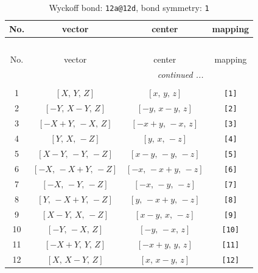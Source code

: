 \documentclass[fleqn,8pt]{jsarticle}
\begin{document}
\begin{longtable}{cccc}
\caption{Wyckoff bond: {\tt 12a@12d}, bond symmetry: {\tt 1}}
 \\
 \hline \hline
No. & vector & center & mapping \\ \hline \endfirsthead

\multicolumn{3}{l}{\tablename\ \thetable{}} \\
 \hline \hline
No. & vector & center & mapping \\ \hline \endhead

 \hline \hline
\multicolumn{3}{r}{\footnotesize\it continued ...} \\ \endfoot

 \hline \hline
\multicolumn{3}{r}{} \\ \endlastfoot

1 & $\left[ X,\, Y,\, Z \right]$ & $\left[ x,\, y,\, z \right]$ & {\tt [1]} \\ \hline
2 & $\left[ - Y,\, X - Y,\, Z \right]$ & $\left[ - y,\, x - y,\, z \right]$ & {\tt [2]} \\ \hline
3 & $\left[ - X + Y,\, - X,\, Z \right]$ & $\left[ - x + y,\, - x,\, z \right]$ & {\tt [3]} \\ \hline
4 & $\left[ Y,\, X,\, - Z \right]$ & $\left[ y,\, x,\, - z \right]$ & {\tt [4]} \\ \hline
5 & $\left[ X - Y,\, - Y,\, - Z \right]$ & $\left[ x - y,\, - y,\, - z \right]$ & {\tt [5]} \\ \hline
6 & $\left[ - X,\, - X + Y,\, - Z \right]$ & $\left[ - x,\, - x + y,\, - z \right]$ & {\tt [6]} \\ \hline
7 & $\left[ - X,\, - Y,\, - Z \right]$ & $\left[ - x,\, - y,\, - z \right]$ & {\tt [7]} \\ \hline
8 & $\left[ Y,\, - X + Y,\, - Z \right]$ & $\left[ y,\, - x + y,\, - z \right]$ & {\tt [8]} \\ \hline
9 & $\left[ X - Y,\, X,\, - Z \right]$ & $\left[ x - y,\, x,\, - z \right]$ & {\tt [9]} \\ \hline
10 & $\left[ - Y,\, - X,\, Z \right]$ & $\left[ - y,\, - x,\, z \right]$ & {\tt [10]} \\ \hline
11 & $\left[ - X + Y,\, Y,\, Z \right]$ & $\left[ - x + y,\, y,\, z \right]$ & {\tt [11]} \\ \hline
12 & $\left[ X,\, X - Y,\, Z \right]$ & $\left[ x,\, x - y,\, z \right]$ & {\tt [12]} \\
\end{longtable}
\end{document}
